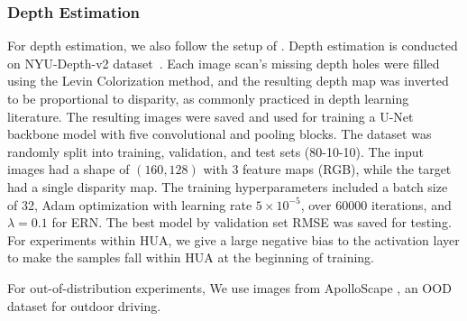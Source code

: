 \subsubsection{Depth Estimation}For depth estimation, we also follow the setup of \citeauthor{NEURIPS2020_aab08546}. Depth estimation is conducted on  NYU-Depth-v2 dataset~\cite{silberman2012indoor}. Each image scan's missing depth holes were filled using the Levin Colorization method, and the resulting depth map was inverted to be proportional to disparity, as commonly practiced in depth learning literature. 
The resulting images were saved and used for training a U-Net \cite{ronneberger2015u} backbone model with five convolutional and pooling blocks. The dataset was randomly split into training, validation, and test sets (80-10-10). The input images had a shape of $(160,128)$ with 3 feature maps (RGB), while the target had a single disparity map. 
The training hyperparameters included a batch size of 32, Adam optimization with learning rate $5 \times 10^{-5}$, over 60000 iterations, and $\lambda=0.1$ for ERN. The best model by validation set RMSE was saved for testing. For experiments within HUA, we give a large negative bias to the activation layer to make the samples fall within HUA at the beginning of training.

For out-of-distribution experiments, We use images from ApolloScape \cite{huang2018apolloscape}, an OOD dataset for outdoor driving.


